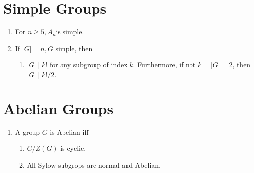 \documentclass[10pt]{article}
\begin{document}
\begin{multicols*}{3}
  \section{Simple Groups}
  \begin{enumerate}
    \item For $n\geq5,A_{n}$is simple.
    \item If $|G|=n, G$ simple, then
    \begin{enumerate}
      \item $|G|\mid k!$ for any subgroup of index $k$. Furthermore, if not
      $k=|G|=2$, then $|G|\mid k!/2$.
    \end{enumerate}
  \end{enumerate}

  \section{Abelian Groups}
  \begin{enumerate}
    \item A group $G$ is Abelian iff
    \begin{enumerate}
      \item $G/Z(G)$ is cyclic.
      \item All Sylow subgrops are normal and Abelian.
    \end{enumerate}
  \end{enumerate}


\end{multicols*}
\end{document}
